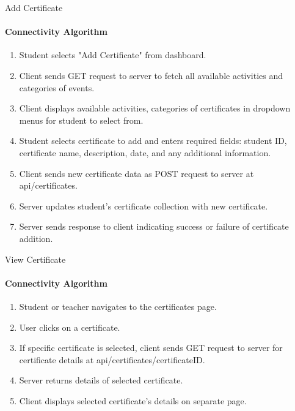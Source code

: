 \begin{frame}{Add Certificate}
    \framesubtitle{Connectivity Algorithm}
        \begin{enumerate}
            

\item Student selects "Add Certificate" from dashboard.
\item Client sends GET request to server to fetch all available activities and categories of events.
\item  Client displays available activities, categories of certificates in dropdown menus for student to select from.
\item  Student selects certificate to add and enters required fields: student ID, certificate name, description, date, and any additional information.
\item Client sends new certificate data as POST request to server at api/certificates.
\item  Server updates student's certificate collection with new certificate.
\item  Server sends response to client indicating success or failure of certificate addition.
        \end{enumerate}
    
\end{frame}

\begin{frame}{View Certificate}
    \framesubtitle{Connectivity Algorithm}
    \begin{enumerate}

\item Student or teacher navigates to the certificates page.
\item User clicks on a certificate.
\item If specific certificate is selected, client sends GET request to server for certificate details at api/certificates/{certificateID}.
\item  Server returns details of selected certificate.
\item  Client displays selected certificate's details on separate page.
    \end{enumerate}
    
\end{frame}

